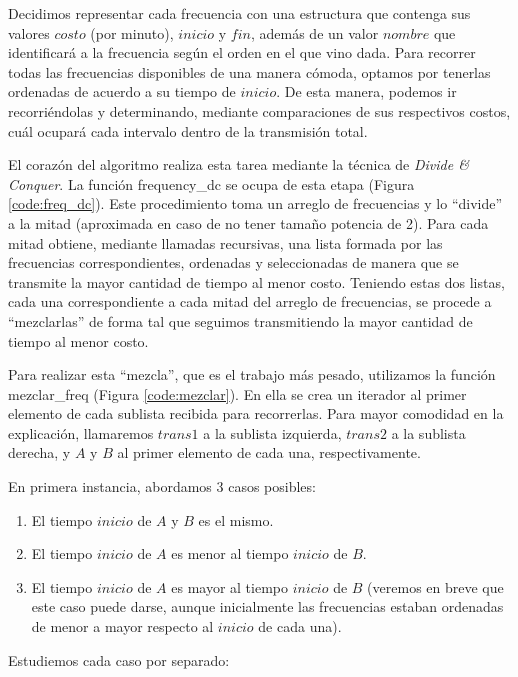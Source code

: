 Decidimos representar cada frecuencia con una estructura que contenga sus valores $costo$ (por minuto), $inicio$ y $fin$, además de un valor $nombre$ que identificará a la frecuencia según el orden en el que vino dada.  Para recorrer todas las frecuencias disponibles de una manera cómoda, optamos por tenerlas ordenadas de acuerdo  a su tiempo de $inicio$.  De esta manera, podemos ir recorriéndolas y determinando, mediante comparaciones de sus respectivos costos, cuál ocupará cada intervalo dentro de la transmisión total.

El corazón del algoritmo realiza esta tarea mediante la técnica de {\it Divide \& Conquer}.  La función {\sc frequency_dc} se ocupa de esta etapa (Figura \ref{code:freq_dc}).  Este procedimiento toma un arreglo de frecuencias y lo ``divide'' a la mitad (aproximada en caso de no tener tamaño potencia de 2).  Para cada mitad obtiene, mediante llamadas recursivas, una lista formada por las frecuencias correspondientes, ordenadas y seleccionadas de manera que se transmite la mayor cantidad de tiempo al menor costo.  Teniendo estas dos listas, cada una correspondiente a cada mitad del arreglo de frecuencias, se procede a ``mezclarlas'' de forma tal que seguimos transmitiendo la mayor cantidad de tiempo al menor costo.

Para realizar esta ``mezcla'', que es el trabajo más pesado, utilizamos la función {\sc mezclar_freq} (Figura \ref{code:mezclar}). En ella se crea un iterador al primer elemento de cada sublista recibida para recorrerlas.  Para mayor comodidad en la explicación, llamaremos $trans1$ a la sublista izquierda, $trans2$ a la sublista derecha, y $A$ y $B$ al primer elemento de cada una, respectivamente.

En primera instancia, abordamos 3 casos posibles: 

\begin{enumerate}
\item El tiempo $inicio$ de $A$ y $B$ es el mismo.
\item El tiempo $inicio$ de $A$ es menor al tiempo $inicio$ de $B$.
\item El tiempo $inicio$ de $A$ es mayor al tiempo $inicio$ de $B$ (veremos en breve que este caso puede darse, aunque inicialmente las frecuencias estaban ordenadas de menor a mayor respecto al $inicio$ de cada una).
\end{enumerate}

Estudiemos cada caso por separado:

\vspace*{0.15cm}

